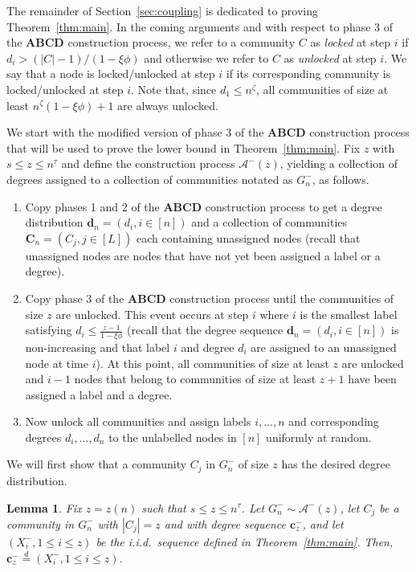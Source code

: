 \documentclass[12pt]{article}
\newtheorem{lemma}[theorem]{Lemma}
\theoremstyle{definition}
\theoremstyle{remark}
\theoremstyle{remark}
\numberwithin{theorem}{section}
\newcommand{\abcdLower}{\ensuremath{\mathcal{A}^-(z)}}
\begin{document}
The remainder of Section~\ref{sec:coupling} is dedicated to proving Theorem~\ref{thm:main}. In the coming arguments and with respect to phase 3 of the \textbf{ABCD} construction process, we refer to a community $C$ as \textit{locked} at step $i$ if $d_i > (|C|-1)/(1-\xi \phi)$ and otherwise we refer to $C$ as \textit{unlocked} at step $i$. We say that a node is locked/unlocked at step $i$ if its corresponding community is locked/unlocked at step $i$. Note that, since $d_1 \le n^{\zeta}$, all communities of size at least $n^{\zeta}(1-\xi \phi)+1$ are always unlocked.

We start with the modified version of phase 3 of the \textbf{ABCD} construction process that will be used to prove the lower bound in Theorem~\ref{thm:main}. Fix $z$ with $s \leq z \leq n^\tau$ and define the construction process $\abcdLower$, yielding a collection of degrees assigned to a collection of communities notated as $G_n^-$, as follows.
\begin{enumerate}
\item Copy phases 1 and 2 of the \textbf{ABCD} construction process to get a degree distribution $\textbf{d}_n = (d_i,i \in [n])$ and a collection of communities $\textbf{C}_n = (C_j,j \in [L])$ each containing unassigned nodes (recall that unassigned nodes are nodes that have not yet been assigned a label or a degree). 
\item Copy phase 3 of the \textbf{ABCD} construction process until the communities of size $z$ are unlocked. This event occurs at step $i$ where $i$ is the smallest label satisfying $d_i \leq \frac{z-1}{1-\xi \phi}$ (recall that the degree sequence $\mathbf{d}_n = (d_i, i \in [n])$ is non-increasing and that label $i$ and degree $d_i$ are assigned to an unassigned node at time $i$). At this point, all communities of size at least $z$ are unlocked and $i-1$ nodes that belong to communities of size at least $z+1$ have been assigned a label and a degree. 
\item Now unlock all communities and assign labels $i,\dots,n$ and corresponding degrees $d_i,\dots,d_n$ to the unlabelled nodes in $[n]$ uniformly at random. 
\end{enumerate}

We will first show that a community $C_j$ in $G_n^-$ of size $z$ has the desired degree distribution. 

\begin{lemma}\label{lem:deg dist lower}
Fix $z=z(n)$ such that $s \leq z \leq n^\tau$. Let $G_n^- \sim \abcdLower$, let $C_j$ be a community in $G_n^-$ with $|C_j| = z$ and with degree sequence $\mathbf{c}_z^-$, and let $(X_i^-, 1 \leq i \leq z)$ be the i.i.d.\ sequence defined in Theorem~\ref{thm:main}. Then, $\mathbf{c}_z^- \stackrel{d}{=} (X_i^-, 1 \leq i \leq z)$. 
\end{lemma}
\end{document}

